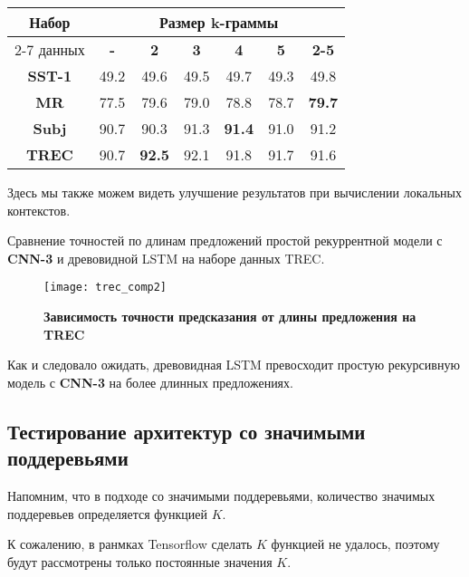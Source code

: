 \vspace{5mm}
\begin{minipage}{\linewidth}
 \label{tab:title} 
\begin{tabular}{|c|c|c|c|c|c|c|}
\hline
\multirow{2}{*}{Набор}   &                \multicolumn{6}{c|}{Размер k-граммы} \\ \cline{2-7} 
     данных              & \textbf{-} & \textbf{2} & \textbf{3} & \textbf{4} & \textbf{5} & \textbf{2-5} \\ \hline
\textbf{SST-1}           & 49.2    &  49.6    & 49.5     & 49.7     & 49.3     & 49.8  \\ \hline
\textbf{MR}              & 77.5     &  79.6    & 79.0    & 78.8     & 78.7     & \textbf{79.7} \\\hline
\textbf{Subj}            & 90.7     &  90.3    & 91.3     &\textbf{91.4}& 91.0 &  91.2 \\\hline
\textbf{TREC}            & 90.7     &  \textbf{92.5}    & 92.1     & 91.8      & 91.7     &  91.6 \\\hline
\end{tabular}
\end{minipage}
\vspace{5mm}

Здесь мы также можем видеть улучшение результатов при вычислении локальных контекстов.

Сравнение точностей по длинам предложений простой рекуррентной модели с \textbf{CNN-3} и древовидной LSTM на наборе данных TREC.

\begin{figure}[H]
\texttt{[image: trec\_comp2]}
\caption{\textbf{Зависимость точности предсказания от длины предложения на TREC}}
\label{fig:context_ex}
\end{figure}

Как и следовало ожидать, древовидная LSTM превосходит простую рекурсивную модель с \textbf{CNN-3} на более длинных предложениях.

\subsection{Тестирование архитектур со значимыми поддеревьями}

Напомним, что в подходе со значимыми поддеревьями, количество значимых поддеревьев определяется функцией $K$.

К сожалению, в ранмках Tensorflow сделать $K$ функцией не удалось, поэтому будут рассмотрены только постоянные значения $K$.

